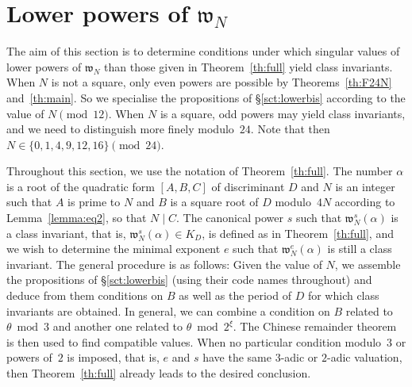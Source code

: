 \documentclass[12pt,twoside,leqno]{article}
\numberwithin{equation}{section}
\newcommand{\w}{\mathfrak w}
\newcommand{\K}{K}
\begin{document}
\section{Lower powers of \texorpdfstring {$\w_N$}{wN}}
\label{sct:specialization}

The aim of this section is to determine conditions under which singular
values of lower powers of $\w_N$ than those given in Theorem~\ref {th:full}
yield class invariants. When $N$ is not a square, only even powers are
possible by Theorems~\ref {th:F24N} and~\ref {th:main}. So we specialise
the propositions of \S\ref{sct:lowerbis} according to the value of
$N \pmod {12}$. When $N$ is a square, odd powers may yield class invariants,
and we need to distinguish more finely modulo~$24$. Note that then
$N \in \{0, 1, 4, 9, 12, 16 \} \pmod {24}$.

Throughout this section, we use the notation of Theorem~\ref {th:full}.
The number $\alpha$ is a root of the quadratic form $[A, B, C]$ of
discriminant $D$ and $N$ is an integer such that $A$ is prime to $N$ and
$B$ is a square root of $D$ modulo~$4 N$ according to
Lemma~\ref {lemma:eq2}, so that $N \mid C$. The canonical power
$s$ such that $\w_N^s (\alpha)$ is a class invariant, that is,
$\w_N^s (\alpha) \in \K_D$, is defined as
in Theorem~\ref {th:full}, and we wish to determine the minimal
exponent $e$ such that $\w_N^e (\alpha)$ is still a class invariant.
The general procedure is as follows: Given the value of $N$,
we assemble the propositions of \S\ref{sct:lowerbis} (using
their code names throughout) and deduce from them conditions on $B$
as well as the period of $D$ for which class invariants are
obtained. In general, we can combine a condition on $B$ related to
$\theta\bmod 3$ and another one related to $\theta\bmod 2^{\xi}$. The
Chinese remainder theorem is then used to find compatible values.
When no particular condition modulo~$3$ or powers of~$2$ is imposed,
that is, $e$ and $s$ have the same $3$-adic or $2$-adic valuation,
then Theorem~\ref {th:full} already leads to the desired conclusion.
\end{document}
